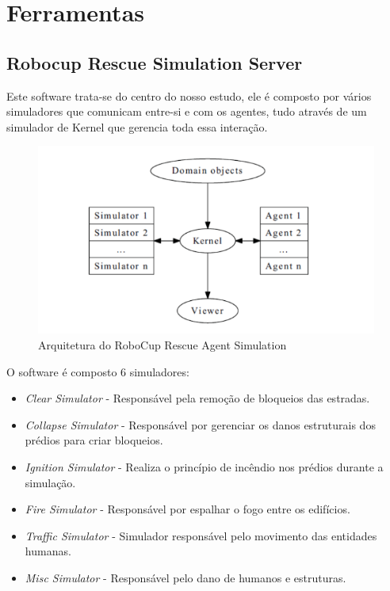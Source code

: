 \documentclass[conference]{IEEEtran}
\begin{document}
\section{Ferramentas}

\subsection{Robocup Rescue Simulation Server}

Este software trata-se do centro do nosso estudo, ele é composto por vários simuladores que comunicam entre-si e com os agentes, tudo através de um simulador de Kernel que gerencia toda essa interação.

\begin{figure}[htbp]
\centerline{\includegraphics[scale=0.4]{fig1.png}}
\caption{Arquitetura do RoboCup Rescue Agent Simulation\cite{b1}}
\label{fig1}
\end{figure}

O software é composto 6 simuladores:
\begin{itemize}
\item \textit {Clear Simulator} - Responsável pela remoção de bloqueios das estradas. 
\item \textit {Collapse Simulator} - Responsável por gerenciar os danos estruturais dos prédios para criar bloqueios.
\item \textit {Ignition Simulator} - Realiza o princípio de incêndio nos prédios durante a simulação.
\item \textit {Fire Simulator} - Responsável por espalhar o fogo entre os edifícios.
\item \textit {Traffic Simulator} - Simulador responsável pelo movimento das entidades humanas.
\item \textit {Misc Simulator} - Responsável pelo dano de humanos e estruturas.
\end{itemize}
\end{document}
